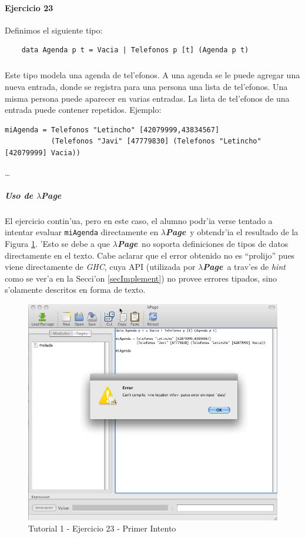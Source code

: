 \documentclass[a4paper]{article}
\newcommand{\hpage}{\textbf{\textsl{$\lambda$Page}}}
\begin{document}
\newpage
\paragraph{Ejercicio 23}Definimos el siguiente tipo:
\begin{center}\begin{lstlisting}
	data Agenda p t = Vacia | Telefonos p [t] (Agenda p t)
\end{lstlisting}\end{center}
\subparagraph{}Este tipo modela una agenda de tel'efonos.  A una agenda se le puede agregar una nueva entrada, donde se registra para una persona una lista de tel'efonos.  Una misma persona puede aparecer en varias entradas.  La lista de tel'efonos de una entrada puede contener repetidos.  Ejemplo:
\begin{center}\begin{lstlisting}
miAgenda = Telefonos "Letincho" [42079999,43834567] 
           (Telefonos "Javi" [47779830] (Telefonos "Letincho" [42079999] Vacia)) 
\end{lstlisting}\end{center}
\ldots
\subparagraph{Uso de \hpage}El ejercicio contin'ua, pero en este caso, el alumno podr'ia verse tentado a intentar evaluar \texttt{miAgenda} directamente en \hpage\ y obtendr'ia el resultado de la Figura \ref{tut109}.  'Esto se debe a que \hpage\ no soporta definiciones de tipos de datos directamente en el texto.  Cabe aclarar que el error obtenido no es ``prolijo'' pues viene directamente de \textsl{GHC}, cuya API (utilizada por \hpage\ a trav'es de \textsl{hint} como se ver'a en la Secci'on \ref{secImplement}) no provee errores tipados, sino s'olamente descritos en forma de texto.
\begin{figure}[hp]
	\begin{center}
        	\includegraphics[width=.75\textwidth]{pictures/tut1/09}
		\caption{Tutorial 1 - Ejercicio 23 - Primer Intento}
		\label{tut109}
	\end{center}
\end{figure}
\end{document}
